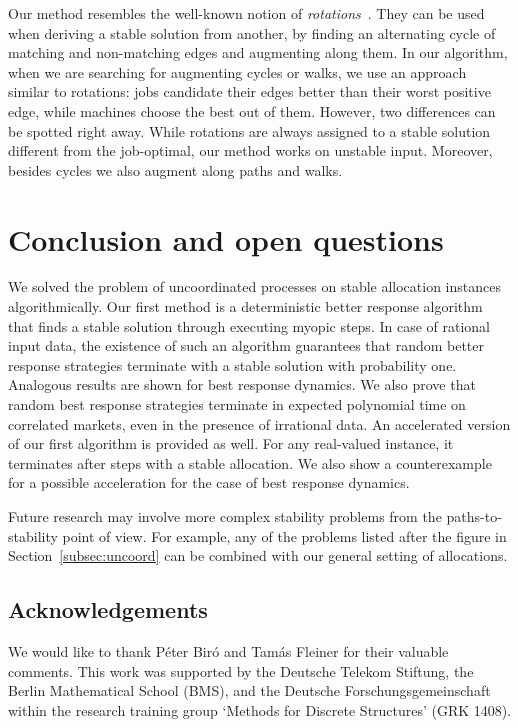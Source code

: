 \documentclass{llncs}
\begin{document}
Our method resembles the well-known notion of \emph{rotations}~\cite{irvingbook}. They can be used when deriving a stable solution from another, by finding an alternating cycle of matching and non-matching edges and augmenting along them. In our algorithm, when we are searching for augmenting cycles or walks, we use an approach similar to rotations: jobs candidate their edges better than their worst positive edge, while machines choose the best out of them. However, two differences can be spotted right away. While rotations are always assigned to a stable solution different from the job-optimal, our method works on unstable input. Moreover, besides cycles we also augment along paths and walks.

\section*{Conclusion and open questions}

We solved the problem of uncoordinated processes on stable allocation instances algorithmically. Our first method is a deterministic better response algorithm that finds a stable solution through executing myopic steps. In case of rational input data, the existence of such an algorithm guarantees that random better response strategies terminate with a stable solution with probability one. Analogous results are shown for best response dynamics. We also prove that random best response strategies terminate in expected polynomial time on correlated markets, even in the presence of irrational data. An accelerated version of our first algorithm is provided as well. For any real-valued instance, it terminates after  steps with a stable allocation. We also show a counterexample for a possible acceleration for the case of best response dynamics.

Future research may involve more complex stability problems from the paths-to-stability point of view. For example, any of the problems listed after the figure in Section~\ref{subsec:uncoord} can be combined with our general setting of allocations.

\subsection*{Acknowledgements}

We would like to thank P\'eter Bir\'o and Tam\'as Fleiner for their valuable comments. This work was supported by the Deutsche Telekom Stiftung, the Berlin Mathematical School (BMS), and the Deutsche Forschungsgemeinschaft within the research training group `Methods for Discrete Structures' (GRK 1408).




\end{document}

